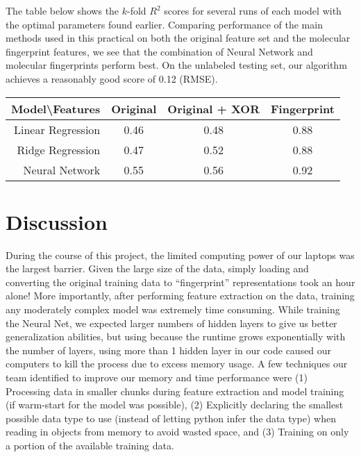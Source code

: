 \documentclass[12pt]{article}
\begin{document}
The table below shows the $k$-fold $R^2$ scores for several runs of each model with the optimal parameters found earlier. Comparing performance of the main methods used in this practical on both the original feature set and the molecular fingerprint features, we see that the combination of Neural Network and molecular fingerprints perform best. On the unlabeled testing set, our algorithm achieves a reasonably good score of 0.12 (RMSE).
\begin{center}
	\begin{tabular}{r|c|c|c}
		\hline
		Model\textbackslash Features & Original & Original + XOR & Fingerprint \\ \hline
		Linear Regression & 0.46 & 0.48 & 0.88 \\
		Ridge Regression & 0.47 &  0.52 & 0.88 \\
		Neural Network & 0.55 & 0.56 & 0.92 \\ \hline
	\end{tabular}
\end{center}


\section{Discussion}

During the course of this project, the limited computing power of our laptops was the largest barrier. Given the large size of the data, simply loading and converting the original training data to ``fingerprint'' representations took an hour alone! More importantly, after performing feature extraction on the data, training any moderately complex model was extremely time consuming. While training the Neural Net, we expected larger numbers of hidden layers to give us better generalization abilities, but using because the runtime grows exponentially with the number of layers, using more than 1 hidden layer in our code caused our computers to kill the process due to excess memory usage. A few techniques our team identified to improve our memory and time performance were (1) Processing data in smaller chunks during feature extraction and model training (if warm-start for the model was possible), (2) Explicitly declaring the smallest possible data type to use (instead of letting python infer the data type) when reading in objects from memory to avoid wasted space, and (3) Training on only a portion of the available training data.
\end{document}
